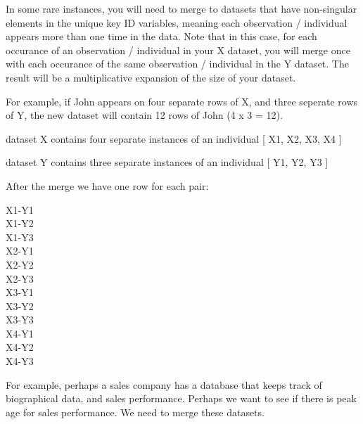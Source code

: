 \documentclass[]{book}
\theoremstyle{definition}
\theoremstyle{definition}
\theoremstyle{definition}
\theoremstyle{remark}
\begin{document}
In some rare instances, you will need to merge to datasets that have
non-singular elements in the unique key ID variables, meaning each
observation / individual appears more than one time in the data. Note
that in this case, for each occurance of an observation / individual in
your X dataset, you will merge once with each occurance of the same
observation / individual in the Y dataset. The result will be a
multiplicative expansion of the size of your dataset.

For example, if John appears on four separate rows of X, and three
seperate rows of Y, the new dataset will contain 12 rows of John (4 x 3
= 12).

dataset X contains four separate instances of an individual {[} X1, X2,
X3, X4 {]}

dataset Y contains three separate instances of an individual {[} Y1, Y2,
Y3 {]}

After the merge we have one row for each pair:

X1-Y1\\
X1-Y2\\
X1-Y3\\
X2-Y1\\
X2-Y2\\
X2-Y3\\
X3-Y1\\
X3-Y2\\
X3-Y3\\
X4-Y1\\
X4-Y2\\
X4-Y3

For example, perhaps a sales company has a database that keeps track of
biographical data, and sales performance. Perhaps we want to see if
there is peak age for sales performance. We need to merge these
datasets.
\end{document}
